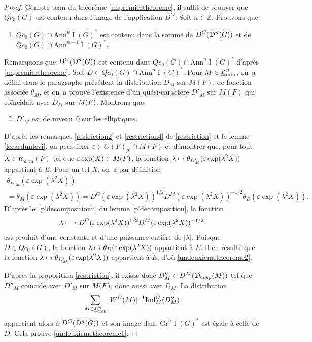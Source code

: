 \documentclass[11pt]{article}
\numberwithin{equation}{section}\providecommand{\og}{«\,}\providecommand{\fg}{\,»}
\let\mathcal \EuScript
\newcommand{\NoChangel}[1]{%
\expandafter\let\csname old\string#1\endcsname=#1
\let#1=\relax
\newcommand{#1}{\mathcode`l="716C\csname old\string#1\endcsname\mathcode`l="7160 }%
}
\let\epsilon\varepsilon
\newcommand\mto{\mathchoice{\longmapsto}{\mapsto}{\mapsto}{\mapsto}}
\newcommand{\mfrm}{\mathfrak{m}}
\newcommand{\Ann}{\mathrm{Ann}}
\newcommand{\cusp}{\mathrm{cusp}}
\newcommand{\rell}{\mathrm{ell}} \NoChangel{\rell}
\newcommand{\Gr}{\mathrm{Gr}}
\newcommand{\Ind}{\mathrm{Ind}}
\newcommand{\tn}{\mathrm{tn}}
\DeclareMathOperator{\rI}{I}
\newcommand{\cD}{\mathcal{D}}
\newcommand{\cL}{\mathcal{L}}
\newcommand{\ZZ}{\mathbb{Z}}
\theoremstyle{plain}
\theoremstyle{definition}
\begin{document}
\begin{proof}
Compte tenu du théorème \ref{unpremiertheoreme}, il suffit de prouver que $Qc_{0}(G)$ est contenu dans l'image de l'application $D^G$. Soit $n\in \ZZ$. Prouvons que
\begin{enumerate}
\item\label{undeuxiemetheoreme1}
$Qc_{0}(G)\cap \Ann^n\rI(G)^*$ est contenu dans la somme de $D^G(\cD^n(G))$ et de $Qc_{0}(G)\cap \Ann^{n+1}\rI(G)^*$.
\end{enumerate}

Remarquons que $D^G(\cD^n(G))$ est contenu dans $Qc_{0}(G)\cap \Ann^n\rI(G)^*$ d'après \ref{unpremiertheoreme}. Soit $D\in Qc_{0}(G)\cap \Ann^n\rI(G)^*$. Pour $M\in \underline{\cL}_{\min}^n$, on~a défini dans le paragraphe précédent la distribution $D_{M}$ sur $M(F)$, de fonction associée $\theta_{M}$, et on~a prouvé l'existence d'un quasi-caractère $D'_{M}$ sur $M(F)$ qui coïncidait avec $D_{M}$ sur $M_{\rell}(F)$. Montrons que
\begin{enumerate}\setcounter{enumi}{1}
\item\label{undeuxiemetheoreme2}
$D'_{M}$ est de niveau~$0$ sur les elliptiques.
\end{enumerate}

D'après les remarques \eqref{restriction2} et \eqref{restriction4} de \ref{restriction} et le lemme \ref{lecasdunlevi}, on peut fixer $\epsilon\in G(F)_{p'}\cap M(F)$ et démontrer que, pour tout $X\in \mfrm_{\epsilon,\tn}(F)$ tel que $\epsilon \exp(X)\in M_{\rell}(F)$, la fonction $\lambda\mto \theta_{D'_{M}}(\epsilon \exp(\lambda^2X))$ appartient à $E$. Pour un tel $X$, on~a par définition
\begin{multline*}
\theta_{D'_{M}}(\epsilon \exp(\lambda^2X))\\
=\theta_{M}(\epsilon \exp(\lambda^2X))=D^G(\epsilon \exp(\lambda^2X))^{1/2}D^M(\epsilon \exp(\lambda^2X))^{-1/2}\theta_{D}(\epsilon \exp(\lambda^2X)).
\end{multline*}
D'après le~\eqref{p'decompositionii} du lemme \ref{p'decomposition}, la fonction
\[
\lambda\mto D^G(\epsilon \exp(\lambda^2X))^{1/2}D^M(\epsilon \exp(\lambda^2X))^{-1/2}
\]
est produit d'une constante et d'une puissance entière de $\vert \lambda\vert $. Puisque $D\in Qc_{0}(G)$, la fonction $\lambda\mto \theta_{D}(\epsilon \exp(\lambda^2X))$ appartient à $E$. Il en résulte que la fonction $\lambda\mto \theta_{D'_{M}}(\epsilon \exp(\lambda^2X))$ appartient à $E$, d'où \eqref{undeuxiemetheoreme2}.

D'après la proposition \ref{restriction}, il existe donc $D''_{M}\in D^M(\cD_{\cusp}(M))$ tel que $D''_{M}$ coïncide avec $D'_{M}$ sur $M_{\rell}(F)$, donc aussi avec $D_{M}$. La distribution
\[
\sum_{M\in \underline{\cL}_{\min}^n} \vert W^G(M)\vert ^{-1}\Ind_{M}^G(D''_{M})
\]
appartient alors à $D^G(\cD^n(G))$ et son image dans $\Gr^n\rI(G)^*$ est égale à celle de $D$. Cela prouve \eqref{undeuxiemetheoreme1}.


\end{proof}
\end{document}
